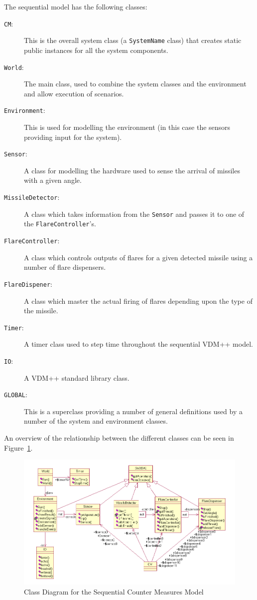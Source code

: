 \documentclass{overturerepchap}
\begin{document}
The sequential model has the following classes:

\begin{description}
\item[\texttt{CM}:] This is the overall system class (a 
\texttt{SystemName} class) that creates static public instances for all the
system components. 
\item[\texttt{World}:] The main class, used to combine the system classes
and the environment and allow execution of scenarios.
\item[\texttt{Environment}:] This is used for modelling the environment (in
this case the sensors providing input for the system).
\item[\texttt{Sensor}:] A class for modelling the hardware used to
sense the arrival of missiles with a given angle.
\item[\texttt{MissileDetector}:] A class which takes information from
the \texttt{Sensor} and passes it to one of the \texttt{FlareController}'s.
\item[\texttt{FlareController}:] A class which controls outputs of flares for a
given detected missile using a number of flare dispensers.
\item[\texttt{FlareDispener}:] A class which master the actual firing of
flares depending upon the type of the missile.
\item[\texttt{Timer}:] A timer class used to step time throughout the 
sequential VDM++ model.
\item[\texttt{IO}:] A VDM++ standard library class.
\item[\texttt{GLOBAL}:] This is a superclass providing a number of general 
definitions used by a number of the system and environment classes.
\end{description}

An overview of the relationship between the different classes can be
seen in Figure~\ref{fig:classdiagseq}.

\begin{figure}
\begin{center}
\includegraphics[width=\textwidth]{figures/seqCMclassdiag.png}
\end{center}
\caption{Class Diagram for the Sequential Counter Measures Model\label{fig:classdiagseq}}
\end{figure}
\end{document}

